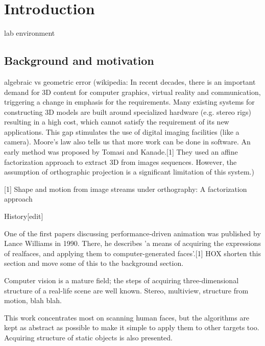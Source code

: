 \section{Introduction}

lab environment


\thispagestyle{empty}

\subsection{Background and motivation}

algebraic vs geometric error
(wikipedia: In recent decades, there is an important demand for 3D content for computer graphics, virtual reality and communication, triggering a change in emphasis for the requirements. Many existing systems for constructing 3D models are built around specialized hardware (e.g. stereo rigs) resulting in a high cost, which cannot satisfy the requirement of its new applications. This gap stimulates the use of digital imaging facilities (like a camera). Moore's law also tells us that more work can be done in software. An early method was proposed by Tomasi and Kanade.[1] They used an affine factorization approach to extract 3D from images sequences. However, the assumption of orthographic projection is a significant limitation of this system.)

[1] Shape and motion from image streams under orthography: A factorization approach

History[edit]

One of the first papers discussing performance-driven animation was published by Lance Williams in 1990. There, he describes 'a means of acquiring the expressions of realfaces, and applying them to computer-generated faces'.[1]
HOX shorten this section and move some of this to the background section.

Computer vision is a mature field; the steps of acquiring three-dimensional structure of a real-life scene are well known.
Stereo, multiview, structure from motion, blah blah.

This work concentrates most on scanning human faces, but the algorithms are kept as abstract as possible to make it simple to apply them to other targets too.
Acquiring structure of static objects is also presented.



